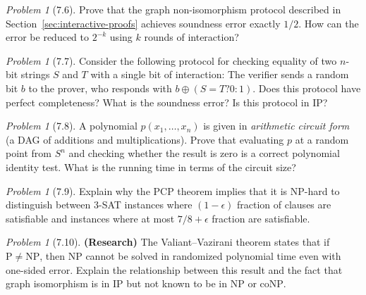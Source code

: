 \documentclass[twoside,12pt]{book}
\theoremstyle{plain}
\theoremstyle{definition}
\theoremstyle{remark}
\newtheorem{problem}[theorem]{Problem}
\begin{document}
\begin{problem}[7.6]
Prove that the graph non-isomorphism protocol described in Section~\ref{sec:interactive-proofs} achieves soundness error exactly $1/2$. How can the error be reduced to $2^{-k}$ using $k$ rounds of interaction?
\end{problem}

\begin{problem}[7.7]
Consider the following protocol for checking equality of two $n$-bit strings $S$ and $T$ with a single bit of interaction: The verifier sends a random bit $b$ to the prover, who responds with $b \oplus (S = T ? 0 : 1)$. Does this protocol have perfect completeness? What is the soundness error? Is this protocol in $\mathrm{IP}$?
\end{problem}

\begin{problem}[7.8]
A polynomial $p(x_1, \ldots, x_n)$ is given in \emph{arithmetic circuit form} (a DAG of additions and multiplications). Prove that evaluating $p$ at a random point from $S^n$ and checking whether the result is zero is a correct polynomial identity test. What is the running time in terms of the circuit size?
\end{problem}

\begin{problem}[7.9]
Explain why the PCP theorem implies that it is NP-hard to distinguish between 3-SAT instances where $(1-\epsilon)$ fraction of clauses are satisfiable and instances where at most $7/8 + \epsilon$ fraction are satisfiable.
\end{problem}

\begin{problem}[7.10]
\textbf{(Research)} The Valiant--Vazirani theorem states that if $\mathrm{P} \neq \mathrm{NP}$, then NP cannot be solved in randomized polynomial time even with one-sided error. Explain the relationship between this result and the fact that graph isomorphism is in $\mathrm{IP}$ but not known to be in $\mathrm{NP}$ or $\mathrm{coNP}$.
\end{problem}
\end{document}
